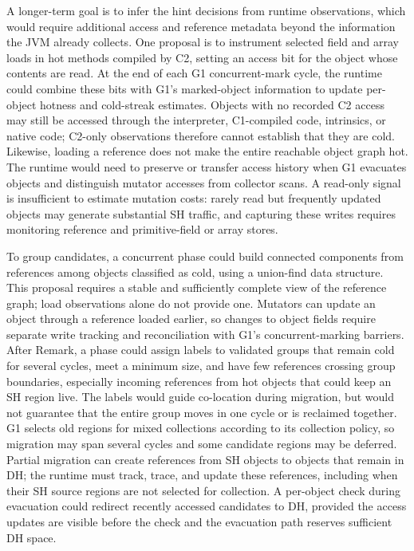 A longer-term goal is to infer the hint decisions from runtime observations, which would require additional access and reference metadata beyond the information the JVM already collects.
One proposal is to instrument selected field and array loads in hot methods compiled by C2, setting an access bit for the object whose contents are read.
At the end of each G1 concurrent-mark cycle, the runtime could combine these bits with G1's marked-object information to update per-object hotness and cold-streak estimates.
Objects with no recorded C2 access may still be accessed through the interpreter, C1-compiled code, intrinsics, or native code; C2-only observations therefore cannot establish that they are cold.
Likewise, loading a reference does not make the entire reachable object graph hot.
The runtime would need to preserve or transfer access history when G1 evacuates objects and distinguish mutator accesses from collector scans.
A read-only signal is insufficient to estimate mutation costs: rarely read but frequently updated objects may generate substantial SH traffic, and capturing these writes requires monitoring reference and primitive-field or array stores.

To group candidates, a concurrent phase could build connected components from references among objects classified as cold, using a union-find data structure.
This proposal requires a stable and sufficiently complete view of the reference graph; load observations alone do not provide one.
Mutators can update an object through a reference loaded earlier, so changes to object fields require separate write tracking and reconciliation with G1's concurrent-marking barriers.
After Remark, a phase could assign labels to validated groups that remain cold for several cycles, meet a minimum size, and have few references crossing group boundaries, especially incoming references from hot objects that could keep an SH region live.
The labels would guide co-location during migration, but would not guarantee that the entire group moves in one cycle or is reclaimed together.
G1 selects old regions for mixed collections according to its collection policy, so migration may span several cycles and some candidate regions may be deferred.
Partial migration can create references from SH objects to objects that remain in DH; the runtime must track, trace, and update these references, including when their SH source regions are not selected for collection.
A per-object check during evacuation could redirect recently accessed candidates to DH, provided the access updates are visible before the check and the evacuation path reserves sufficient DH space.

